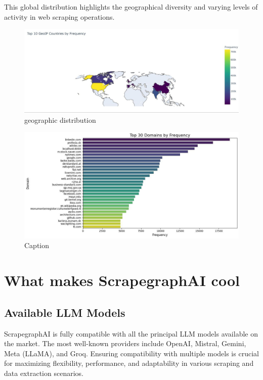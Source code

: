 This global distribution highlights the geographical diversity and varying levels of activity in web scraping operations.

\begin{figure}[H]
    \centering
    \includegraphics[scale=0.25]{Assets/countries.jpg}
    \caption{geographic distribution}
    \label{fig:geographic-distribution}
\end{figure}

\begin{figure}[H]
    \centering
    \includegraphics[scale=0.45]{Assets/websites.jpg}
    \caption{Caption}
    \label{fig:enter-label}
\end{figure}
\section{What makes ScrapegraphAI  cool}
\subsection{Available LLM Models}

ScrapegraphAI is fully compatible with all the principal LLM models available on the market. The most well-known providers include OpenAI, Mistral, Gemini, Meta (LLaMA), and Groq. Ensuring compatibility with multiple models is crucial for maximizing flexibility, performance, and adaptability in various scraping and data extraction scenarios.

